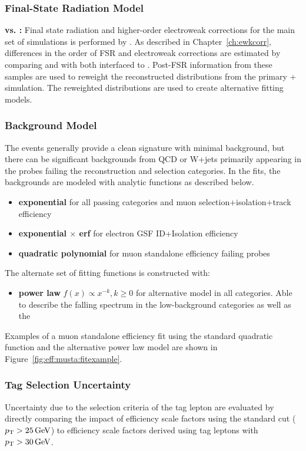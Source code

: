\subsubsection{Final-State Radiation Model}
\textbf{\PYTHIA vs. \PHOTOS:} Final state radiation and higher-order electroweak corrections for the main set of simulations is performed by . As described in Chapter~\ref{ch:ewkcorr}, differences in the order of FSR and electroweak corrections are estimated by comparing \PYTHIA and \PHOTOS with both interfaced to \POWHEG. Post-FSR information from these samples are used to reweight the reconstructed  \mll distributions from the primary \aMCATNLO+ simulation. The reweighted \mll distributions are used to create alternative fitting models.

\subsubsection{Background Model}\label{ch:eff:bkg}
The \zll events generally provide a clean signature with minimal background, but there can be significant backgrounds from QCD or W+jets primarily appearing in the probes failing the reconstruction and selection categories. In the fits, the backgrounds are modeled with analytic functions as described below. 
\begin{itemize}
\item \textbf{exponential} for all passing categories and muon selection+isolation+track efficiency
\item \textbf{exponential $\times$ erf} for electron GSF ID+Isolation efficiency 
\item \textbf{quadratic polynomial} for muon standalone efficiency failing probes
\end{itemize}
The alternate set of fitting functions is constructed with:
\begin{itemize}
\item \textbf{power law} $f(x)\propto x^{-k},k\geq0$ for alternative model in all categories. Able to describe the falling \mll spectrum in the low-background categories as well as the 
\end{itemize}
Examples of a muon standalone efficiency fit using the standard quadratic function and the alternative power law model are shown in Figure~\ref{fig:eff:musta:fitexample}. 



\subsubsection{Tag Selection Uncertainty}
Uncertainty due to the selection criteria of the tag lepton are evaluated by directly comparing the impact of efficiency scale factors using the standard cut ($p_{\mathrm{T}} > 25 \,\text{Ge\hspace{-.08em}V}$) to efficiency scale factors derived using tag leptons with $p_{\mathrm{T}} > 30\,\text{Ge\hspace{-.08em}V}$. 

